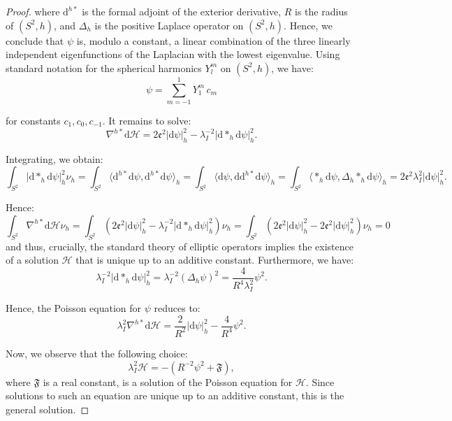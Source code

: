 \documentclass[10pt,a4paper]{amsart}
\def\cH{\mathcal{H}}
\def\dd{\mathrm{d}}
\def\frc{\mathfrak{F}}
\begin{document}
\begin{proof}
\noindent
where $\dd^{h\ast}$ is the formal adjoint of the exterior derivative, $R$ is the radius of $(S^2,h)$, and $\Delta_h$ is the positive Laplace operator on $(S^2,h)$. Hence, we conclude that $\psi$ is, modulo a constant, a linear combination of the three linearly independent eigenfunctions of the Laplacian with the lowest eigenvalue. Using standard notation for the spherical harmonics $Y^m_l$ on $(S^2,h)$, we have: 
\begin{equation*}
\psi = \sum_{m =-1}^1 Y_1^m\, c_m
\end{equation*}

\noindent
for constants $c_1 , c_0, c_{-1}$. It remains to solve:
\begin{equation*}
\nabla^{h\ast}\dd \cH     =   2 \mathfrak{e}^2 \vert \dd \psi\vert^2_h   - \lambda_I^{-2}\vert \dd\ast_h \dd\psi \vert^2_{h}.
\end{equation*}

\noindent
Integrating, we obtain:
\begin{equation*}
\int_{S^2} \vert \dd\ast_h \dd\psi \vert^2_{h} \nu_h = \int_{S^2} \langle  \dd^{h\ast}\dd\psi , \dd^{h\ast}\dd\psi \rangle_{h} = \int_{S^2} \langle   \dd\psi , \dd \dd^{h\ast}\dd\psi \rangle_{h}= \int_{S^2} \langle  \ast_h  \dd\psi , \Delta_h \ast_h\dd\psi \rangle_{h} = 2 \mathfrak{e}^2 \lambda_I^2  \vert \dd \psi\vert_h^2.
\end{equation*}

\noindent
Hence:
\begin{equation*}
\int_{S^2} \nabla^{h\ast}\dd \cH  \nu_h   =  \int_{S^2}    (2 \mathfrak{e}^2 \vert \dd \psi\vert^2_h   - \lambda_I^{-2}\vert \dd\ast_h \dd\psi \vert^2_{h}) \nu_h  =  \int_{S^2}   (2\mathfrak{e}^2 \vert \dd \psi\vert^2_h   - 2 \mathfrak{e}^2   \vert \dd \psi\vert_h^2 ) \nu_h = 0
\end{equation*}
and thus, crucially, the standard theory of elliptic operators implies the existence of a solution $\cH$ that is unique up to an additive constant. Furthermore, we have:
\begin{equation*}
\lambda_I^{-2}\vert \dd\ast_h \dd\psi \vert^2_{h} = \lambda_I^{-2} (\Delta_h \psi)^2 = \frac{4}{R^4 \lambda^2_I} \psi^2.
\end{equation*}

\noindent
Hence, the Poisson equation for $\psi$ reduces to:
\begin{equation*}
\lambda^2_I \nabla^{h\ast}\dd \cH     =   \frac{2}{R^2} \vert \dd \psi\vert^2_h   - \frac{4}{R^4}\psi^2.
\end{equation*}

\noindent
Now, we observe that the following choice:
\begin{equation*}
\lambda_I^2\cH=-(R^{-2}\psi^2+\frc),
\end{equation*}
where $\frc$ is a real constant, is a solution of the Poisson equation for $\cH$. Since solutions to such an equation are unique up to an additive constant, this is the general solution.
\end{proof}
\end{document}
